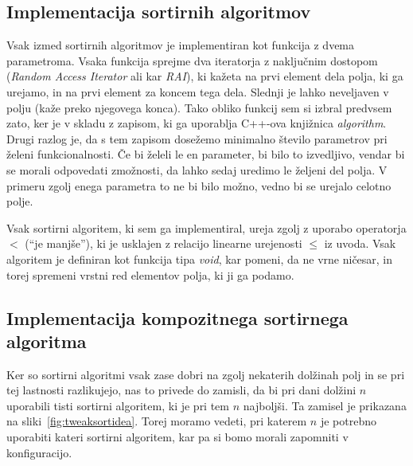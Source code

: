 \documentclass[a4paper,oneside,12pt]{article}
\begin{document}
\subsection{Implementacija sortirnih algoritmov}
\label{chapter:sortimplementation}
Vsak izmed sortirnih algoritmov je implementiran kot funkcija z dvema parametroma.
Vsaka funkcija sprejme dva iteratorja z naključnim dostopom (\emph{Random Access
Iterator} ali kar \emph{RAI}),
ki kažeta na prvi element dela polja, ki ga urejamo, in na prvi element za koncem tega dela.
Slednji je lahko neveljaven v polju (kaže preko njegovega konca).
Tako obliko funkcij sem si izbral predvsem zato, ker je v skladu z zapisom, ki ga uporablja
\mbox{C++-ova} knjižnica \emph{algorithm}. Drugi razlog je, da s tem zapisom dosežemo minimalno število
parametrov pri želeni funkcionalnosti. Če bi želeli le en parameter, bi bilo to
izvedljivo, vendar bi se morali odpovedati zmožnosti, da lahko sedaj uredimo le željeni
del polja. V primeru zgolj enega parametra to ne bi bilo možno, vedno bi se
urejalo celotno polje.

Vsak sortirni algoritem, ki sem ga implementiral, ureja zgolj z uporabo operatorja $<$
(``je manjše''), ki je usklajen z relacijo linearne urejenosti $\leq$ iz uvoda. Vsak
algoritem je definiran kot funkcija tipa \emph{void}, kar pomeni, da ne vrne ničesar, in
torej spremeni vrstni red elementov polja, ki ji ga podamo.

\subsection{Implementacija kompozitnega sortirnega algoritma}
\label{chapter:tweaksort}
Ker so sortirni algoritmi vsak zase dobri na zgolj nekaterih dolžinah polj in se pri tej
lastnosti razlikujejo, nas to privede do zamisli, da bi pri dani dolžini $n$ uporabili tisti
sortirni algoritem, ki je pri tem $n$ najboljši. Ta zamisel je prikazana na sliki~\ref{fig:tweaksortidea}.
Torej moramo vedeti, pri katerem $n$ je
potrebno uporabiti kateri sortirni algoritem, kar pa si bomo morali zapomniti
v konfiguracijo.%
\end{document}
